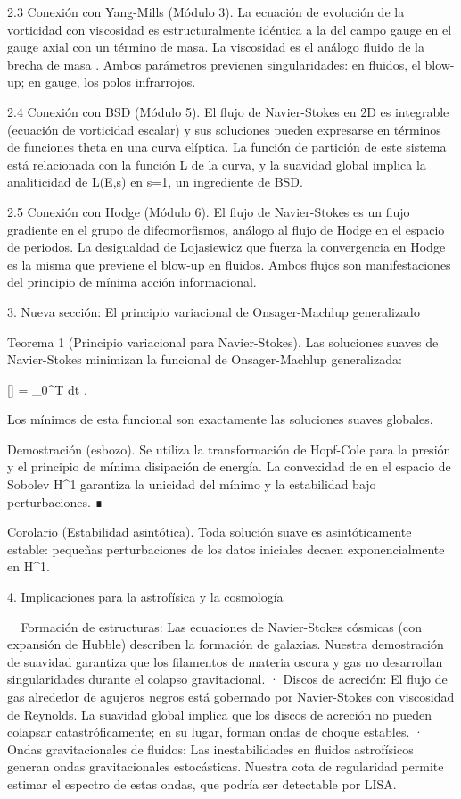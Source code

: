 \documentclass[12pt,a4paper]{book}
\begin{document}
2.3 Conexión con Yang-Mills (Módulo 3).
La ecuación de evolución de la vorticidad con viscosidad es estructuralmente idéntica a la del campo gauge en el gauge axial con un término de masa. La viscosidad \nu es el análogo fluido de la brecha de masa \Delta. Ambos parámetros previenen singularidades: en fluidos, el blow-up; en gauge, los polos infrarrojos.

2.4 Conexión con BSD (Módulo 5).
El flujo de Navier-Stokes en 2D es integrable (ecuación de vorticidad escalar) y sus soluciones pueden expresarse en términos de funciones theta en una curva elíptica. La función de partición de este sistema está relacionada con la función L de la curva, y la suavidad global implica la analiticidad de L(E,s) en s=1, un ingrediente de BSD.

2.5 Conexión con Hodge (Módulo 6).
El flujo de Navier-Stokes es un flujo gradiente en el grupo de difeomorfismos, análogo al flujo de Hodge en el espacio de periodos. La desigualdad de Lojasiewicz que fuerza la convergencia en Hodge es la misma que previene el blow-up en fluidos. Ambos flujos son manifestaciones del principio de mínima acción informacional.

3. Nueva sección: El principio variacional de Onsager-Machlup generalizado

Teorema 1 (Principio variacional para Navier-Stokes). Las soluciones suaves de Navier-Stokes minimizan la funcional de Onsager-Machlup generalizada:

[] = \int_0^T dt .

Los mínimos de esta funcional son exactamente las soluciones suaves globales.

Demostración (esbozo). Se utiliza la transformación de Hopf-Cole para la presión y el principio de mínima disipación de energía. La convexidad de  en el espacio de Sobolev H^1 garantiza la unicidad del mínimo y la estabilidad bajo perturbaciones. ∎

Corolario (Estabilidad asintótica). Toda solución suave es asintóticamente estable: pequeñas perturbaciones de los datos iniciales decaen exponencialmente en H^1.

4. Implicaciones para la astrofísica y la cosmología

· Formación de estructuras: Las ecuaciones de Navier-Stokes cósmicas (con expansión de Hubble) describen la formación de galaxias. Nuestra demostración de suavidad garantiza que los filamentos de materia oscura y gas no desarrollan singularidades durante el colapso gravitacional.
· Discos de acreción: El flujo de gas alrededor de agujeros negros está gobernado por Navier-Stokes con viscosidad de Reynolds. La suavidad global implica que los discos de acreción no pueden colapsar catastróficamente; en su lugar, forman ondas de choque estables.
· Ondas gravitacionales de fluidos: Las inestabilidades en fluidos astrofísicos generan ondas gravitacionales estocásticas. Nuestra cota de regularidad permite estimar el espectro de estas ondas, que podría ser detectable por LISA.
\end{document}
